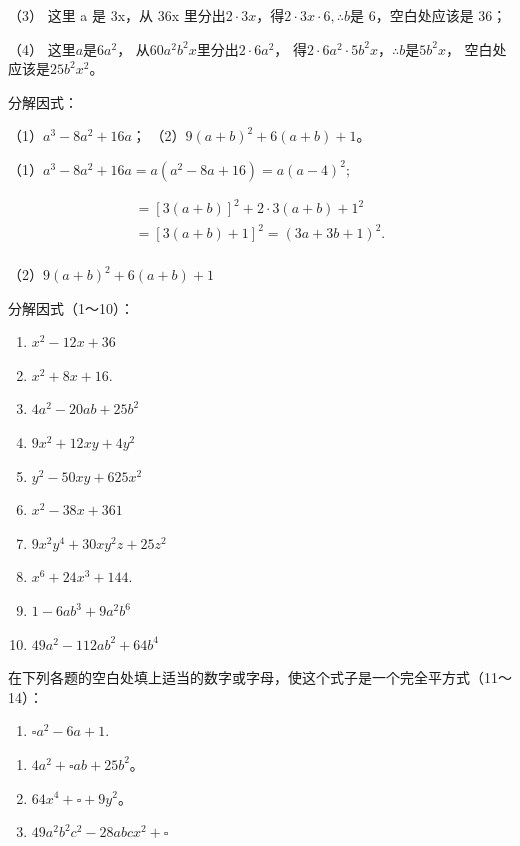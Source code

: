 （3） 这里 a 是 3x，从 36x
里分出\(2 \cdot 3x\)，得\(2 \cdot 3x \cdot 6, \therefore b\)是
6，空白处应该是 36；

（4） 这里\(a\)是\(6a^2\)， 从\(60a^2b^2x\)里分出\(2 \cdot 6a^2\)，
得\(2 \cdot 6a^2 \cdot 5b^2x\)，\(\therefore b\)是\(5b^2x\)，
空白处应该是\(25b^2x^2\)。

 分解因式：

（1）\(a^3 - 8a^2 + 16a\)； （2）\(9(a + b)^2 + 6(a + b) + 1\)。

（1）\(a^3 - 8a^2 + 16a = a(a^2 - 8a + 16) = a(a - 4)^2;\)

\[
\begin{array}{l} = [ 3 (a + b) ] ^{2} + 2 \cdot 3 (a + b) + 1 ^{2} \\ = [ 3 (a + b) + 1 ] ^{2} = (3 a + 3 b + 1) ^{2}. \\ \end{array}
\]

（2）\(9(a + b)^2 + 6(a + b) + 1\)

分解因式（1～10）：

\begin{enumerate}[start=1]
\item
  \(x^{2} - 12x + 36\)
\item
  \(x^{2} + 8x + 16.\)
\item
  \(4a^{2} - 20ab + 25b^{2}\)
\item
  \(9x^{2} + 12xy + 4y^{2}\)
\item
  \(y^{2} - 50xy + 625x^{2}\)
\item
  \(x^{2} - 38x + 361\)
\item
  \(9x^{2}y^{4} + 30xy^{2}z + 25z^{2}\)
\item
  \(x^{6} + 24x^{3} + 144.\)
\item
  \(1 - 6ab^{3} + 9a^{2}b^{6}\)
\item
  \(49a^{2} - 112ab^{2} + 64b^{4}\)
\end{enumerate}

在下列各题的空白处填上适当的数字或字母，使这个式子是一个完全平方式（11～14）：

\begin{enumerate}[start=11]
\item
  \(\square a^{2} - 6a + 1.\)
\end{enumerate}

\begin{enumerate}[start=12]
\item
  \(4a^{2} + \square ab + 25b^{2}\)。
\item
  \(64x^{4} + \square + 9y^{2}\)。
\item
  \(49a^{2}b^{2}c^{2} - 28abcx^{2} + \square\)
\end{enumerate}

